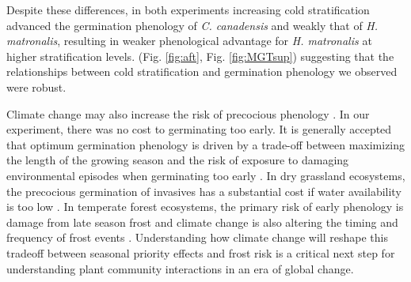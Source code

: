 \documentclass{article}[11pt]
\begin{document}
Despite these differences, in both experiments increasing cold stratification advanced the germination phenology of \textit{C. canadensis} and weakly that of \textit{H. matronalis}, resulting in weaker phenological advantage for \textit{H. matronalis} at higher stratification levels. (Fig. \ref{fig:aft}, Fig.  \ref{fig:MGTsup}) suggesting that the relationships between cold stratification and germination phenology we observed were robust. 


Climate change may also increase the risk of precocious phenology \citep{Inouye:2000ud}. In our experiment, there was no cost to germinating too early. It is generally accepted that optimum germination phenology is driven by a trade-off between maximizing the length of the growing season and the risk of exposure to damaging environmental episodes when germinating too early \citep{Augspurger:2017vu}. In dry grassland ecosystems, the precocious germination of invasives has a substantial cost if water availability is too low \citep{Wainwright_2011}. In temperate forest ecosystems, the primary risk of early phenology is damage from late season frost \citep{Kollas:2014vn} and climate change is also altering the timing and frequency of frost events \citep{}. Understanding how climate change will reshape this tradeoff between seasonal priority effects and frost risk is a critical next step for understanding plant community interactions in an era of global change. 
\end{document}

